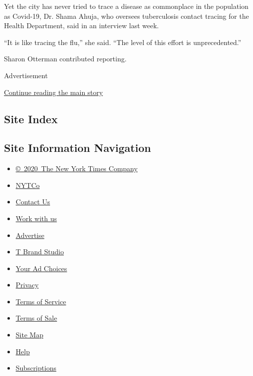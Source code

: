 Yet the city has never tried to trace a disease as commonplace in the
population as Covid-19, Dr. Shama Ahuja, who oversees tuberculosis
contact tracing for the Health Department, said in an interview last
week.

``It is like tracing the flu,'' she said. ``The level of this effort is
unprecedented.''

Sharon Otterman contributed reporting.

Advertisement

\protect\hyperlink{after-bottom}{Continue reading the main story}

\hypertarget{site-index}{%
\subsection{Site Index}\label{site-index}}

\hypertarget{site-information-navigation}{%
\subsection{Site Information
Navigation}\label{site-information-navigation}}

\begin{itemize}
\tightlist
\item
  \href{https://help.nytimes3xbfgragh.onion/hc/en-us/articles/115014792127-Copyright-notice}{©~2020~The
  New York Times Company}
\end{itemize}

\begin{itemize}
\tightlist
\item
  \href{https://www.nytco.com/}{NYTCo}
\item
  \href{https://help.nytimes3xbfgragh.onion/hc/en-us/articles/115015385887-Contact-Us}{Contact
  Us}
\item
  \href{https://www.nytco.com/careers/}{Work with us}
\item
  \href{https://nytmediakit.com/}{Advertise}
\item
  \href{http://www.tbrandstudio.com/}{T Brand Studio}
\item
  \href{https://www.nytimes3xbfgragh.onion/privacy/cookie-policy\#how-do-i-manage-trackers}{Your
  Ad Choices}
\item
  \href{https://www.nytimes3xbfgragh.onion/privacy}{Privacy}
\item
  \href{https://help.nytimes3xbfgragh.onion/hc/en-us/articles/115014893428-Terms-of-service}{Terms
  of Service}
\item
  \href{https://help.nytimes3xbfgragh.onion/hc/en-us/articles/115014893968-Terms-of-sale}{Terms
  of Sale}
\item
  \href{https://spiderbites.nytimes3xbfgragh.onion}{Site Map}
\item
  \href{https://help.nytimes3xbfgragh.onion/hc/en-us}{Help}
\item
  \href{https://www.nytimes3xbfgragh.onion/subscription?campaignId=37WXW}{Subscriptions}
\end{itemize}
